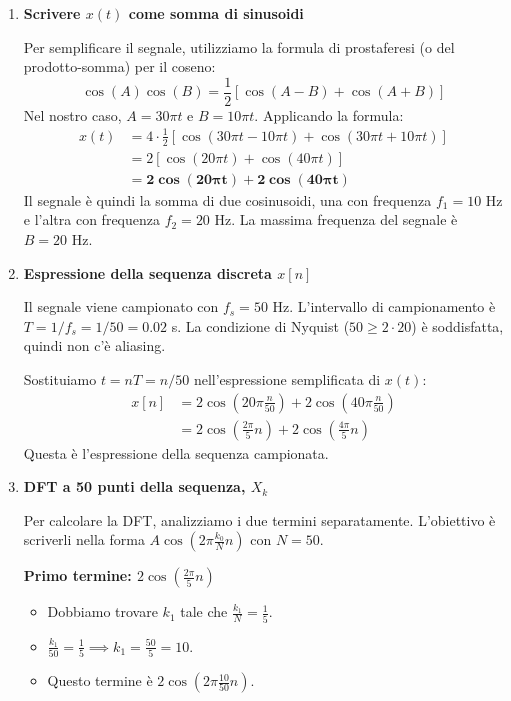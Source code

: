 
\begin{soluzione}{22}
    \begin{enumerate}
        \item \textbf{Scrivere $x(t)$ come somma di sinusoidi}
        
        Per semplificare il segnale, utilizziamo la formula di prostaferesi (o del prodotto-somma) per il coseno:
        \[
            \cos(A)\cos(B) = \frac{1}{2}[\cos(A-B) + \cos(A+B)]
        \]
        Nel nostro caso, $A = 30\pi t$ e $B = 10\pi t$. Applicando la formula:
        \begin{align*}
            x(t) &= 4 \cdot \frac{1}{2} [\cos(30\pi t - 10\pi t) + \cos(30\pi t + 10\pi t)] \\
            &= 2 [\cos(20\pi t) + \cos(40\pi t)] \\
            &= \mathbf{2\cos(20\pi t) + 2\cos(40\pi t)}
        \end{align*}
        Il segnale è quindi la somma di due cosinusoidi, una con frequenza $f_1 = 10$ Hz e l'altra con frequenza $f_2 = 20$ Hz. La massima frequenza del segnale è $B=20$ Hz.

        \item \textbf{Espressione della sequenza discreta $x[n]$}
        
        Il segnale viene campionato con $f_s = 50$ Hz. L'intervallo di campionamento è $T = 1/f_s = 1/50 = 0.02$ s. La condizione di Nyquist ($50 \ge 2 \cdot 20$) è soddisfatta, quindi non c'è aliasing.
        
        Sostituiamo $t = nT = n/50$ nell'espressione semplificata di $x(t)$:
        \begin{align*}
            x[n] &= 2\cos\left(20\pi \frac{n}{50}\right) + 2\cos\left(40\pi \frac{n}{50}\right) \\
            &= 2\cos\left(\frac{2\pi}{5}n\right) + 2\cos\left(\frac{4\pi}{5}n\right)
        \end{align*}
        Questa è l'espressione della sequenza campionata.

        \item \textbf{DFT a 50 punti della sequenza, $X_k$}
        
        Per calcolare la DFT, analizziamo i due termini separatamente. L'obiettivo è scriverli nella forma $A\cos(2\pi \frac{k_0}{N}n)$ con $N=50$.
        
        \textbf{Primo termine: $2\cos\left(\frac{2\pi}{5}n\right)$}
        \begin{itemize}
            \item Dobbiamo trovare $k_1$ tale che $\frac{k_1}{N} = \frac{1}{5}$.
            \item $\frac{k_1}{50} = \frac{1}{5} \implies k_1 = \frac{50}{5} = 10$.
            \item Questo termine è $2\cos(2\pi \frac{10}{50}n)$.
        \end{itemize}
        

\end{enumerate}
\end{soluzione}

